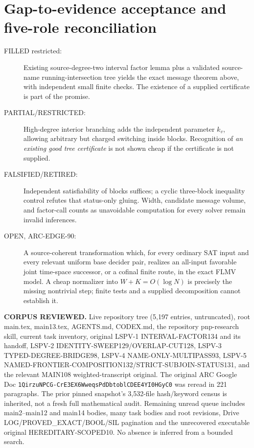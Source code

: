 \documentclass[11pt]{article}
\begin{document}
\section{Gap-to-evidence acceptance and five-role reconciliation}
\begin{description}
\item[FILLED restricted:] Existing source-degree-two interval factor
lemma plus a validated source-name running-intersection tree yields
the exact message theorem above, with independent small finite checks.
The existence of a supplied certificate is part of the promise.
\item[PARTIAL/RESTRICTED:] High-degree interior branching adds the
independent parameter $k_v$, allowing arbitrary but charged switching
inside blocks. Recognition of \emph{an existing good tree certificate}
is not shown cheap if the certificate is not supplied.
\item[FALSIFIED/RETIRED:] Independent satisfiability of blocks suffices;
a cyclic three-block inequality control refutes that status-only
gluing. Width, candidate message volume, and factor-call counts as
unavoidable computation for every solver remain invalid inferences.
\item[OPEN, ARC-EDGE-90:] A source-coherent transformation which,
for every ordinary SAT input and every relevant uniform base decider
pair, realizes an all-input favorable joint time-space successor,
or a cofinal finite route, in the exact FLMV model. A cheap
normalizer into $W+K=O(\log N)$ is precisely the missing nontrivial
step; finite tests and a supplied decomposition cannot establish it.
\end{description}

\textbf{CORPUS REVIEWED.} Live repository tree (5,197 entries,
untruncated), root main.tex, main13.tex, AGENTS.md, CODEX.md,
the repository pnp-research skill, current task inventory,
original LSPV-1 INTERVAL-FACTOR134 and its handoff,
LSPV-2 IDENTITY-SWEEP129/OVERLAP-CUT128,
LSPV-3 TYPED-DEGREE-BRIDGE98,
LSPV-4 NAME-ONLY-MULTIPASS93,
LSPV-5 NAMED-FRONTIER-COMPOSITION132/STRICT-SUBJOIN-STATUS131,
and the relevant MAIN108 weighted-transcript original.
The original ARC Google Doc
\texttt{1QirzuNPCG-CrE3EX6WweqsPdDbtoblCDEE4YI0HGyC0}
was reread in 221 paragraphs. The prior pinned snapshot's
3,532-file hash/keyword census is inherited, not a fresh
full mathematical audit. Remaining unread queue includes
main2--main12 and main14 bodies, many task bodies and root
revisions, Drive LOG/PROVED\_EXACT/BOOL/SIL pagination and
the unrecovered executable original HEREDITARY-SCOPED10.
No absence is inferred from a bounded search.
\end{document}

